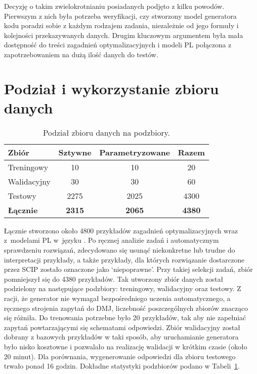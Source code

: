 Decyzję o takim zwielokrotnianiu posiadanych podjęto z kilku powodów. Pierwszym z nich była potrzeba weryfikacji, czy stworzony model generatora kodu  poradzi sobie z każdym rodzajem zadania, niezależnie od jego formuły i kolejności przekazywanych danych. Drugim kluczowym argumentem była mała dostępność do treści zagadnień optymalizacyjnych i modeli PL połączona z zapotrzebowaniem na dużą ilość danych do testów.

\section{Podział i wykorzystanie zbioru danych}

\begin{table}[H]
\caption{Podział zbioru danych na podzbiory.}\label{tab:dataset:stats}
\centering%
\begin{tabular}{|l|c|c|c|}
\hline
\textbf{Zbiór} & \textbf{Sztywne} & \textbf{Parametryzowane} & \textbf{Razem} \\
\hline
Treningowy & 10 & 10 & 20\\
\hline
Walidacyjny & 30 & 30 & 60\\
\hline
Testowy & 2275 & 2025 & 4300\\
\hline
\textbf{Łącznie} & \textbf{2315} & \textbf{2065} & \textbf{4380}\\
\hline
\end{tabular}
\end{table}

Łącznie stworzono około 4800 przykładów zagadnień optymalizacyjnych wraz z~modelami PL w~języku . Po ręcznej analizie zadań i automatycznym sprawdzeniu rozwiązań, zdecydowano się usunąć niekonkretne lub trudne do interpretacji przykłady, a także przykłady, dla których rozwiązanie dostarczone przez SCIP zostało oznaczone jako `niepoprawne'. Przy takiej selekcji zadań, zbiór pomniejszył się do 4380 przykładów. Tak utworzony zbiór danych został podzielony na następujące podzbiory: treningowy, walidacyjny oraz testowy. Z racji, że generator nie wymagał bezpośredniego uczenia automatycznego, a ręcznego strojenia zapytań do DMJ, liczebność poszczególnych zbiorów znacząco się różniła. Do trenowania potrzebne było 20 przykładów, tak aby nie zapełniać zapytań powtarzającymi się schematami odpowiedzi. Zbiór walidacyjny został dobrany z bazowych przykładów w taki sposób, aby uruchamianie generatora było nisko kosztowne i pozwalało na realizację walidacji w krótkim czasie (około 20 minut). Dla porównania, wygenerowanie odpowiedzi  dla zbioru testowego trwało ponad 16 godzin. Dokładne statystyki podzbiorów podano w Tabeli~\ref{tab:dataset:stats}. 

